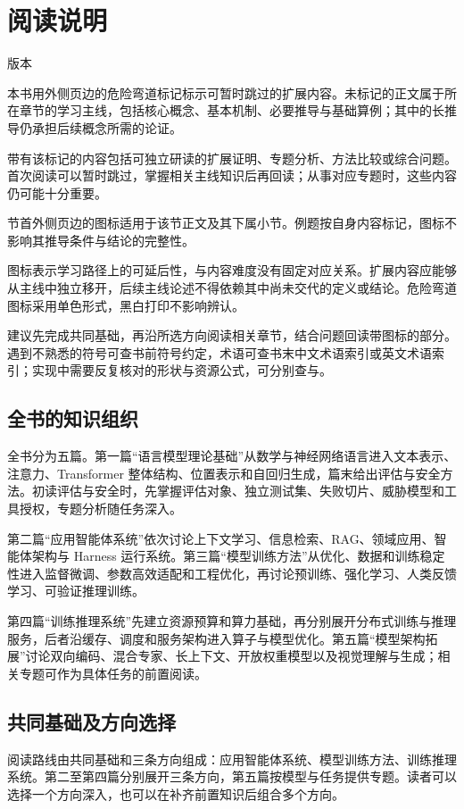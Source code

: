 \chapter*{阅读说明}

\noindent\textsf{\bookedition\quad 版本 \bookversion}\par\medskip

\optional 本书用外侧页边的危险弯道标记标示可暂时跳过的扩展内容。未标记的正文属于所在章节的学习主线，包括核心概念、基本机制、必要推导与基础算例；其中的长推导仍承担后续概念所需的论证。

带有该标记的内容包括可独立研读的扩展证明、专题分析、方法比较或综合问题。首次阅读可以暂时跳过，掌握相关主线知识后再回读；从事对应专题时，这些内容仍可能十分重要。

节首外侧页边的图标适用于该节正文及其下属小节。例题按自身内容标记，图标不影响其推导条件与结论的完整性。

图标表示学习路径上的可延后性，与内容难度没有固定对应关系。扩展内容应能够从主线中独立移开，后续主线论述不得依赖其中尚未交代的定义或结论。危险弯道图标采用单色形式，黑白打印不影响辨认。

建议先完成共同基础，再沿所选方向阅读相关章节，结合问题回读带图标的部分。遇到不熟悉的符号可查书前符号约定，术语可查书末中文术语索引或英文术语索引；实现中需要反复核对的形状与资源公式，可分别查与。

\section*{全书的知识组织}
全书分为五篇。第一篇“语言模型理论基础”从数学与神经网络语言进入文本表示、注意力、Transformer 整体结构、位置表示和自回归生成，篇末给出评估与安全方法。初读评估与安全时，先掌握评估对象、独立测试集、失败切片、威胁模型和工具授权，专题分析随任务深入。

第二篇“应用智能体系统”依次讨论上下文学习、信息检索、RAG、领域应用、智能体架构与 Harness 运行系统。第三篇“模型训练方法”从优化、数据和训练稳定性进入监督微调、参数高效适配和工程优化，再讨论预训练、强化学习、人类反馈学习、可验证推理训练。

第四篇“训练推理系统”先建立资源预算和算力基础，再分别展开分布式训练与推理服务，后者沿缓存、调度和服务架构进入算子与模型优化。第五篇“模型架构拓展”讨论双向编码、混合专家、长上下文、开放权重模型以及视觉理解与生成；相关专题可作为具体任务的前置阅读。

\section*{共同基础及方向选择}
阅读路线由共同基础和三条方向组成：应用智能体系统、模型训练方法、训练推理系统。第二至第四篇分别展开三条方向，第五篇按模型与任务提供专题。读者可以选择一个方向深入，也可以在补齐前置知识后组合多个方向。

